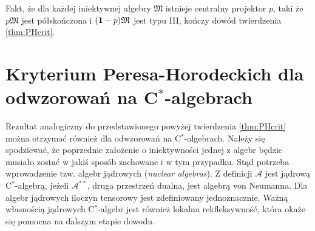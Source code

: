 Fakt, że dla każdej iniektywnej algebry $\mathfrak{M}$
istnieje centralny projektor $p$, taki że $p\mathfrak{M}$
jest półskończona i $({\bf 1}-p)\mathfrak{M}$ jest typu III,
kończy dowód twierdzenia \ref{thm:PHcrit}.


\section{Kryterium Peresa-Horodeckich dla odwzorowań na C$^*$-algebrach}
\label{sec:HorCstar}
Rezultat analogiczny do przedstawionego powyżej twierdzenia \ref{thm:PHcrit}
można otrzymać również dla odwzorowań na C$^*$-algebrach.
Należy się spodziewać, że poprzednie założenie o iniektywności jednej z
algebr będzie musiało zostać w jakiś sposób zachowane i w tym przypadku.
Stąd potrzeba wprowadzenie tzw. algebr jądrowych (\emph{nuclear algebras}).
Z definicji $\mathcal{A}$ jest jądrową C$^{*}$-algebrą,
jeżeli $\mathcal{A}^{**}$, druga przestrzeń dualna,
jest algebrą von Neumanna.
Dla algebr jądrowych iloczyn tensorowy jest zdefiniowany jednoznacznie.
Ważną własnością jądrowych C$^{*}$-algebr jest również lokalna rekfleksywność,
która okaże się pomocna na dalszym etapie dowodu.

